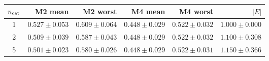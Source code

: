 \begin{tabular}{@{}crrrrr@{}}
\toprule
$n_{\rm cat}$ & M2 mean & M2 worst & M4 mean & M4 worst & $|E|$ \\
\midrule
1 & $0.527 \pm 0.053$ & $0.609 \pm 0.064$ & $0.448 \pm 0.029$ & $0.522 \pm 0.032$ & $1.000 \pm 0.000$ \\
2 & $0.509 \pm 0.039$ & $0.587 \pm 0.043$ & $0.448 \pm 0.029$ & $0.522 \pm 0.032$ & $1.100 \pm 0.308$ \\
5 & $0.501 \pm 0.023$ & $0.580 \pm 0.026$ & $0.448 \pm 0.029$ & $0.522 \pm 0.031$ & $1.150 \pm 0.366$ \\
\bottomrule
\end{tabular}
